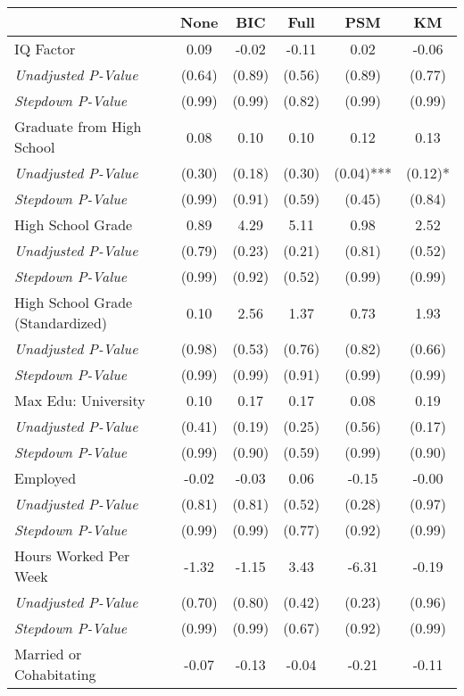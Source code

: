 \begin{tabular}{l c c c c c}
\toprule
 & None & BIC & Full & PSM & KM \\
\midrule
IQ Factor & 0.09 & -0.02 & -0.11 & 0.02 & -0.06 \\
\quad \textit{Unadjusted P-Value} & (0.64) & (0.89) & (0.56) & (0.89) & (0.77) \\
\quad \textit{Stepdown P-Value} & (0.99) & (0.99) & (0.82) & (0.99) & (0.99) \\
Graduate from High School & 0.08 & 0.10 & 0.10 & 0.12 & 0.13 \\
\quad \textit{Unadjusted P-Value} & (0.30) & (0.18) & (0.30) & (0.04)*** & (0.12)* \\
\quad \textit{Stepdown P-Value} & (0.99) & (0.91) & (0.59) & (0.45) & (0.84) \\
High School Grade & 0.89 & 4.29 & 5.11 & 0.98 & 2.52 \\
\quad \textit{Unadjusted P-Value} & (0.79) & (0.23) & (0.21) & (0.81) & (0.52) \\
\quad \textit{Stepdown P-Value} & (0.99) & (0.92) & (0.52) & (0.99) & (0.99) \\
High School Grade (Standardized) & 0.10 & 2.56 & 1.37 & 0.73 & 1.93 \\
\quad \textit{Unadjusted P-Value} & (0.98) & (0.53) & (0.76) & (0.82) & (0.66) \\
\quad \textit{Stepdown P-Value} & (0.99) & (0.99) & (0.91) & (0.99) & (0.99) \\
Max Edu: University & 0.10 & 0.17 & 0.17 & 0.08 & 0.19 \\
\quad \textit{Unadjusted P-Value} & (0.41) & (0.19) & (0.25) & (0.56) & (0.17) \\
\quad \textit{Stepdown P-Value} & (0.99) & (0.90) & (0.59) & (0.99) & (0.90) \\
Employed & -0.02 & -0.03 & 0.06 & -0.15 & -0.00 \\
\quad \textit{Unadjusted P-Value} & (0.81) & (0.81) & (0.52) & (0.28) & (0.97) \\
\quad \textit{Stepdown P-Value} & (0.99) & (0.99) & (0.77) & (0.92) & (0.99) \\
Hours Worked Per Week & -1.32 & -1.15 & 3.43 & -6.31 & -0.19 \\
\quad \textit{Unadjusted P-Value} & (0.70) & (0.80) & (0.42) & (0.23) & (0.96) \\
\quad \textit{Stepdown P-Value} & (0.99) & (0.99) & (0.67) & (0.92) & (0.99) \\
Married or Cohabitating & -0.07 & -0.13 & -0.04 & -0.21 & -0.11 \\

\end{tabular}
